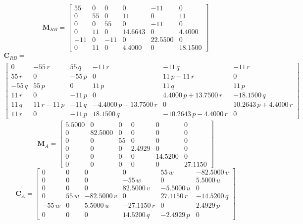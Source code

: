 \documentclass[12pt,a4]{article}
\begin{document}
\begin{equation*}
	\bm{M}_{RB} = \left[\begin{array}{cccccc} 55 & 0 & 0 & 0 & -11 & 0\\ 0 & 55 & 0 & 11 & 0 & 11\\ 0 & 0 & 55 & 0 & -11 & 0\\ 0 & 11 & 0 & 14.6643 & 0 & 4.4000\\ -11 & 0 & -11 & 0 & 22.5500 & 0\\ 0 & 11 & 0 & 4.4000 & 0 & 18.1500 \end{array}\right]
\end{equation*}
\begin{multline*}
	\bm{C}_{RB} = \\
	\left[\begin{array}{cccccc} 0 & -55\,r & 55\,q & -11\,r & -11\,q & -11\,r\\ 55\,r & 0 & -55\,p & 0 & 11\,p-11\,r & 0\\ -55\,q & 55\,p & 0 & 11\,p & 11\,q & 11\,p\\ 11\,r & 0 & -11\,p & 0 & 4.4000\,p+13.7500\,r & -18.1500\,q\\ 11\,q & 11\,r-11\,p & -11\,q & -4.4000\,p-13.7500\,r & 0 & 10.2643\,p+4.4000\,r\\ 11\,r & 0 & -11\,p & 18.1500\,q & -10.2643\,p-4.4000\,r & 0 \end{array}\right]
\end{multline*}
\begin{equation*}
	\bm{M}_{A} = \left[\begin{array}{cccccc} 5.5000 & 0 & 0 & 0 & 0 & 0\\ 0 & 82.5000 & 0 & 0 & 0 & 0\\ 0 & 0 & 55 & 0 & 0 & 0\\ 0 & 0 & 0 & 2.4929 & 0 & 0\\ 0 & 0 & 0 & 0 & 14.5200 & 0\\ 0 & 0 & 0 & 0 & 0 & 27.1150 \end{array}\right]
\end{equation*}
\begin{equation*}
	\bm{C}_{A} = \left[\begin{array}{cccccc} 0 & 0 & 0 & 0 & 55\,w & -82.5000\,v\\ 0 & 0 & 0 & -55\,w & 0 & 5.5000\,u\\ 0 & 0 & 0 & 82.5000\,v & -5.5000\,u & 0\\ 0 & 55\,w & -82.5000\,v & 0 & 27.1150\,r & -14.5200\,q\\ -55\,w & 0 & 5.5000\,u & -27.1150\,r & 0 & 2.4929\,p\\ 0 & 0 & 0 & 14.5200\,q & -2.4929\,p & 0 \end{array}\right]
\end{equation*}
\end{document}
